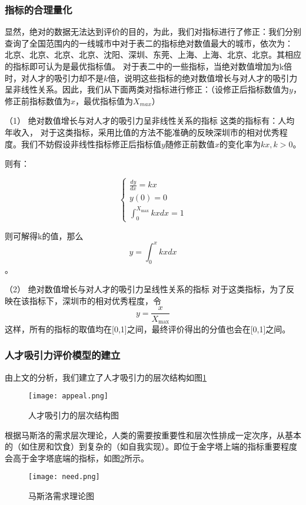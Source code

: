 \documentclass[withoutpreface,bwprint]{cumcmthesis} %
\begin{document}
\subsubsection{指标的合理量化}
显然，绝对的数据无法达到评价的目的，为此，我们对指标进行了修正：我们分别查询了全国范围内的一线城市中对于表二的指标绝对数值最大的城市，依次为： 北京、北京、北京、北京、沈阳、深圳、东莞、上海、上海、北京、北京。其相应的指标即可认为是最优指标值。
对于表二中的一些指标，当绝对数值增加为k倍时，对人才的吸引力却不是$k$倍，说明这些指标的绝对数值增长与对人才的吸引力呈非线性关系。因此，我们从下面两类对指标进行修正：（设修正后指标数值为$y$，修正前指标数值为$x$，最优指标值为$X_{max}$）

（1）	绝对数值增长与对人才的吸引力呈非线性关系的指标
这类的指标有：人均年收入，
对于这类指标，采用比值的方法不能准确的反映深圳市的相对优秀程度。我们不妨假设非线性指标修正后指标值$y$随修正前数值$x$的变化率为$kx,k>0$。
\par
则有： 
      
\begin{equation}
	\left\{ \begin{array}{l}
\frac{{dy}}{{dx}} = kx\\
y(0) = 0\\
\int_0^{{X_{\max }}} {kxdx = 1} 
\end{array} \right.
\end{equation} 

则可解得k的值，那么    \begin{equation}y = \int_0^x {kxdx} \end{equation} 。


（2）	绝对数值增长与对人才的吸引力呈线性关系的指标
对于这类指标，为了反映在该指标下，深圳市的相对优秀程度，令
   \begin{equation}y = \frac{x}{{{X_{\max }}}}\end{equation} 
这样，所有的指标的取值均在[0,1]之间，最终评价得出的分值也会在[0,1]之间。

\subsubsection{人才吸引力评价模型的建立}
由上文的分析，我们建立了人才吸引力的层次结构如图\ref{tab:人才吸引力的层次结构图}
\begin{figure}[!h]
\centering
\texttt{[image: appeal.png]}
\caption{人才吸引力的层次结构图}
\label{tab:人才吸引力的层次结构图}
\end{figure}
\newpage	
根据马斯洛的需求层次理论，人类的需要按重要性和层次性排成一定次序，从基本的（如住房和饮食）到复杂的（如自我实现）。即位于金字塔上端的指标重要程度会高于金字塔底端的指标，如图\ref{tab:马斯洛需求理论图}所示。
\begin{figure}[!h]
\centering
\texttt{[image: need.png]}
\caption{马斯洛需求理论图}
\label{tab:马斯洛需求理论图}
\end{figure}
\end{document}
